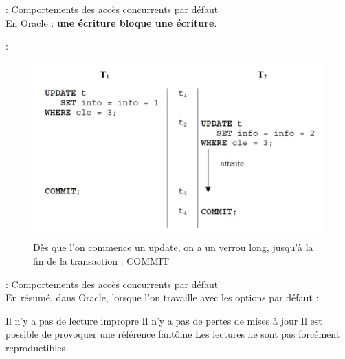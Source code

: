 \documentclass[10pt]{beamer}
\begin{document}
\begin{frame}{\secname : \subsecname}
    Comportements des accès concurrents par défaut \\
    En Oracle : \textbf{une écriture bloque une écriture}.
\end{frame}

\begin{frame}{\secname : \subsecname}
    \begin{figure}
        \begin{center}
            \includegraphics[width=\textwidth]{../assets/img/coherence-de-lecture-3.pdf}
            \caption{Dès que l'on commence un update, on a un verrou long, jusqu'à la fin de la transaction : COMMIT}
        \end{center}
    \end{figure}
\end{frame}

\begin{frame}{\secname : \subsecname}
    Comportements des accès concurrents par défaut \\
    En résumé, dans Oracle, lorsque l'on travaille avec les options par défaut :
    \begin{itemize}
        \pro Il n'y a pas de lecture impropre
        \pro Il n'y a pas de pertes de mises à jour
        \con Il est possible de provoquer une référence fantôme
        \con Les lectures ne sont pas forcément reproductibles
    \end{itemize}
\end{frame}
\end{document}
